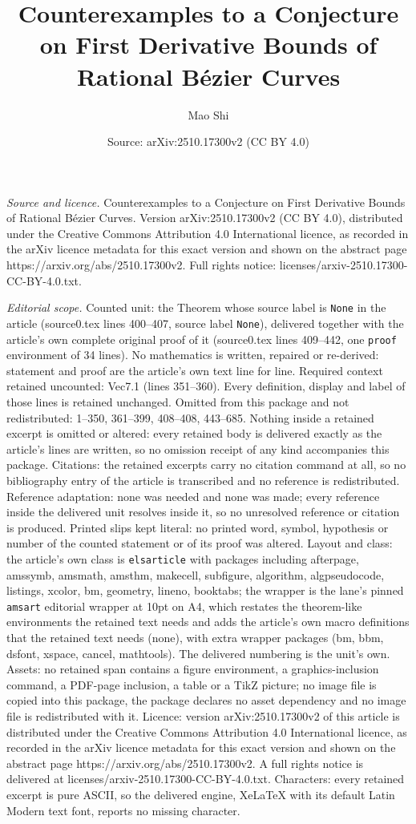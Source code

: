 \documentclass[10pt,a4paper]{amsart}
\title[Counterexamples to a Conjecture on First Derivative Bounds o]{Counterexamples to a Conjecture on First Derivative Bounds of Rational B\'ezier Curves}
\author{Mao Shi}
\date{Source: arXiv:2510.17300v2 (CC BY 4.0)}
\begin{document}
\maketitle

\noindent\emph{Source and licence.} Counterexamples to a Conjecture on First Derivative Bounds of Rational B\'ezier Curves. Version arXiv:2510.17300v2 (CC BY 4.0), distributed under the Creative Commons Attribution 4.0 International licence, as recorded in the arXiv licence metadata for this exact version and shown on the abstract page https://arxiv.org/abs/2510.17300v2. Full rights notice: licenses/arxiv-2510.17300-CC-BY-4.0.txt.\par\smallskip

\noindent\textit{Editorial scope.} Counted unit: the Theorem whose source label is \texttt{None} in the article (source0.tex lines 400--407, source label \texttt{None}), delivered together with the article's own complete original proof of it (source0.tex lines 409--442, one \texttt{proof} environment of 34 lines). No mathematics is written, repaired or re-derived: statement and proof are the article's own text line for line. Required context retained uncounted: Vec7.1 (lines 351--360). Every definition, display and label of those lines is retained unchanged. Omitted from this package and not redistributed: 1--350, 361--399, 408--408, 443--685. Nothing inside a retained excerpt is omitted or altered: every retained body is delivered exactly as the article's lines are written, so no omission receipt of any kind accompanies this package. Citations: the retained excerpts carry no citation command at all, so no bibliography entry of the article is transcribed and no reference is redistributed. Reference adaptation: none was needed and none was made; every reference inside the delivered unit resolves inside it, so no unresolved reference or citation is produced. Printed slips kept literal: no printed word, symbol, hypothesis or number of the counted statement or of its proof was altered. Layout and class: the article's own class is \texttt{elsarticle} with packages including afterpage, amssymb, amsmath, amsthm, makecell, subfigure, algorithm, algpseudocode, listings, xcolor, bm, geometry, lineno, booktabs; the wrapper is the lane's pinned \texttt{amsart} editorial wrapper at 10pt on A4, which restates the theorem-like environments the retained text needs and adds the article's own macro definitions that the retained text needs (none), with extra wrapper packages (bm, bbm, dsfont, xspace, cancel, mathtools). The delivered numbering is the unit's own. Assets: no retained span contains a figure environment, a graphics-inclusion command, a PDF-page inclusion, a table or a TikZ picture; no image file is copied into this package, the package declares no asset dependency and no image file is redistributed with it. Licence: version arXiv:2510.17300v2 of this article is distributed under the Creative Commons Attribution 4.0 International licence, as recorded in the arXiv licence metadata for this exact version and shown on the abstract page https://arxiv.org/abs/2510.17300v2. A full rights notice is delivered at licenses/arxiv-2510.17300-CC-BY-4.0.txt. Characters: every retained excerpt is pure ASCII, so the delivered engine, XeLaTeX with its default Latin Modern text font, reports no missing character.
\end{document}
